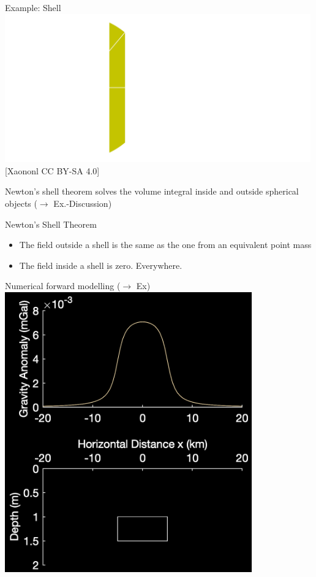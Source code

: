 \begin{frame}
  \begin{PointSix}{Example: Shell}
    \includegraphics[width=0.99\textwidth]{Figures/Gravity/Exported/Shell-diag_reversed_CCBYSA4_0_Xaonon.png}
    \tiny [Xaononl CC BY-SA 4.0]

    \small Newton's shell theorem solves the volume integral inside and outside spherical objects ($\rightarrow$ Ex.-Discussion)
  \end{PointSix}

\end{frame}

\begin{frame}
  \begin{PointSix}{Newton's Shell Theorem}
   \begin{itemize}
      \item The field outside a shell is the same as the one from an equivalent point mass
      \item The field inside a shell is zero. Everywhere.
   \end{itemize}
\end{PointSix}
\end{frame}

\begin{frame}
\begin{PointSix}{Numerical forward modelling ($\rightarrow$ Ex)}
  \includegraphics[width=0.8\textwidth]{Figures/Gravity/Exported/ForwardModelPrismReversed.png}
\end{PointSix}
\end{frame}

